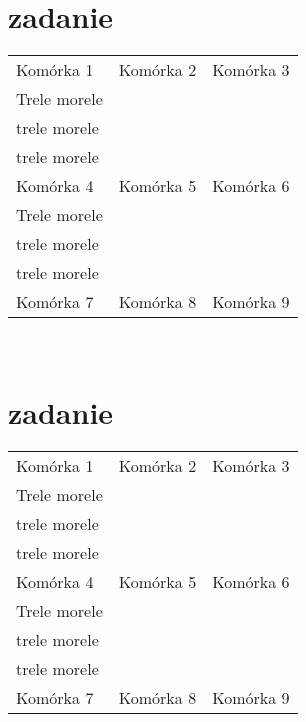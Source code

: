 \documentclass[12pt,a4paper]{article}
\begin{document}
\begin{center}
		\section{zadanie}
	    \begin{tabular}{|m{6cm}|m{2cm}|m{2cm}|}
					
					\hline
					Komórka 1 & Komórka 2 & Komórka 3\\
					Trele morele & & \\
					trele morele & & \\
					trele morele & & \\
					\hline
					Komórka 4 & Komórka 5 & Komórka 6\\
					Trele morele & & \\
					trele morele & & \\
					trele morele & & \\
					\hline
					Komórka 7 & Komórka 8 & Komórka 9\\
					\hline
					
		\end{tabular}\\	
	
	\section{zadanie}
		\begin{tabular}{|m{6cm}|m{2cm}|m{2cm}|}
				
				\hline
				Komórka 1 & Komórka 2 & Komórka 3\\
				Trele morele & & \\
				trele morele & & \\
				trele morele & & \\
				\hline
				Komórka 4 & Komórka 5 & Komórka 6\\
				Trele morele & & \\
				trele morele & & \\
				trele morele & & \\
				\hline
				Komórka 7 & Komórka 8 & Komórka 9\\
				\hline
				
		\end{tabular}\\
			\vspace{1cm}

\end{center}
\end{document}
